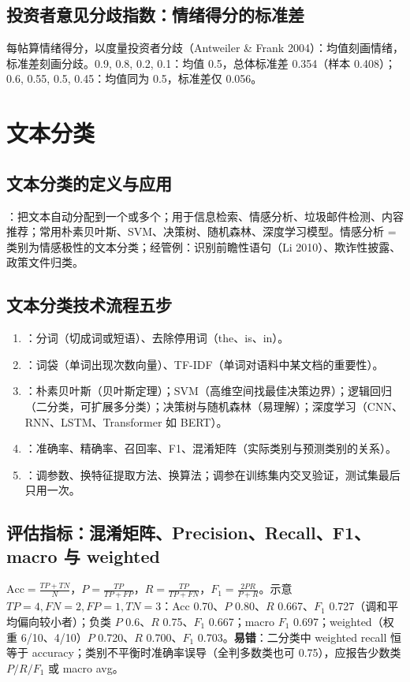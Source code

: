 \subsection{投资者意见分歧指数：情绪得分的标准差}
每帖算情绪得分，以度量投资者分歧（Antweiler \& Frank 2004）：均值刻画情绪，标准差刻画分歧。0.9, 0.8, 0.2, 0.1：均值 0.5，总体标准差 0.354（样本 0.408）；0.6, 0.55, 0.5, 0.45：均值同为 0.5，标准差仅 0.056。

\section{文本分类}

\subsection{文本分类的定义与应用}
：把文本自动分配到一个或多个；用于信息检索、情感分析、垃圾邮件检测、内容推荐；常用朴素贝叶斯、SVM、决策树、随机森林、深度学习模型。情感分析 = 类别为情感极性的文本分类；经管例：识别前瞻性语句（Li 2010）、欺诈性披露、政策文件归类。

\subsection{文本分类技术流程五步}
\begin{enumerate}
\item {}：分词（切成词或短语）、去除停用词（the、is、in）。
\item {}：词袋（单词出现次数向量）、TF-IDF（单词对语料中某文档的重要性）。
\item {}：朴素贝叶斯（贝叶斯定理）；SVM（高维空间找最佳决策边界）；逻辑回归（二分类，可扩展多分类）；决策树与随机森林（易理解）；深度学习（CNN、RNN、LSTM、Transformer 如 BERT）。
\item {}：准确率、精确率、召回率、F1、混淆矩阵（实际类别与预测类别的关系）。
\item {}：调参数、换特征提取方法、换算法；调参在训练集内交叉验证，测试集最后只用一次。
\end{enumerate}

\subsection{评估指标：混淆矩阵、Precision、Recall、F1、macro 与 weighted}
$\text{Acc}=\frac{TP+TN}{N}$，$P=\frac{TP}{TP+FP}$，$R=\frac{TP}{TP+FN}$，$F_1=\frac{2PR}{P+R}$。示意 $TP=4,FN=2,FP=1,TN=3$：Acc 0.70、$P$ 0.80、$R$ 0.667、$F_1$ 0.727（调和平均偏向较小者）；负类 $P$ 0.6、$R$ 0.75、$F_1$ 0.667；macro $F_1$ 0.697；weighted（权重 6/10、4/10）$P$ 0.720、$R$ 0.700、$F_1$ 0.703。\textbf{易错}：二分类中 weighted recall 恒等于 accuracy；类别不平衡时准确率误导（全判多数类也可 0.75），应报告少数类 $P/R/F_1$ 或 macro avg。

